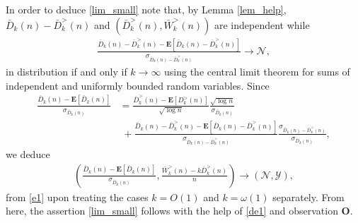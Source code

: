 \documentclass{amsart}       %
\newcommand{\sN}{\mathcal N}
\newcommand{\sY}{\mathcal Y}
\newcommand{\E}[1]{\ensuremath{\mathbf{E} \left[#1 \right]}}
\begin{document}
In order to deduce \eqref{lim_small} note that, by Lemma \ref{lem_help},  $\bar D_k(n)  - \bar D^>_k(n)$ and $(\bar D^>_k(n), \bar W^>_k(n))$ are independent while
\begin{align*}  \frac{\bar D_k(n) - \bar D^>_k(n) - \E{\bar D_k(n) - \bar D^>_k(n)}}{\sigma_{\bar D_k(n) - \bar D^>_k(n)}} \to \sN, \end{align*}
in distribution if and only if $k \to \infty$ using the central limit theorem for sums of independent and uniformly bounded random variables. Since
\begin{align*}
\frac{\bar D_k(n) - \E{\bar D_k(n)}}{\sigma_{\bar D_k(n)}}  & =  \frac{\bar D^>_k(n) - \E{D^>_k(n)}}{\sqrt{\log n}} \frac{\sqrt{\log n}}{\sigma_{\bar D_k(n)}}  \\ 
& \; + \frac{\bar D_k(n) - \bar D^>_k(n) - \E{\bar D_k(n) - \bar D^>_k(n)}}{\sigma_{\bar D_k(n) - \bar D^>_k(n)}} \frac{\sigma_{\bar D_k(n) - \bar D^>_k(n)}}{\sigma_{\bar D_k(n)}},  \end{align*}
we deduce
\begin{align*} \left(\frac{\bar D_k(n) - \E{\bar D_k(n)}}{\sigma_{\bar D_k(n)}}, \frac{\bar W^>_k(n) - k \bar D^>_k(n)}{n}\right) \to (\sN, \sY), \end{align*}
from \eqref{e1}
upon treating the cases $k = O(1)$ and $k = \omega(1)$ separately. From here, the assertion \eqref{lim_small} follows with the help of \eqref{de1} and observation \textbf{O}.
\end{document}
